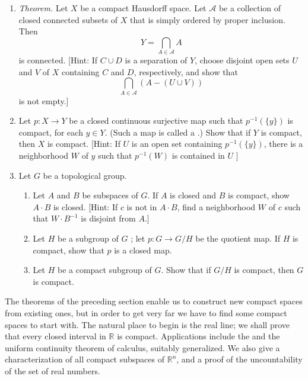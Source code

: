 \begin{enumerate}[itemsep=0.4em, parsep=0pt, topsep=0pt, partopsep=0pt, leftmargin=*, label=\arabic*., ref=\arabic*]
\begin{enumerate}[itemsep=0.2em, parsep=0pt, topsep=0pt, partopsep=0pt, leftmargin=*, label=(\alph*), align=left]
 \item Give examples to show that this theorem fails if you delete the requirement that \(X\) be compact, or if you delete the requirement that the sequence be monotone. [Hint: See the exercises of \S\ 21.]
 \end{enumerate}
\item \textsl{Theorem.} Let \(X\) be a compact Hausdorff space. Let \(\mathcal{A}\) be a collection of closed connected subsets of \(X\) that is simply ordered by proper inclusion. Then \[ Y = \mathop{\bigcap }\limits_{{A \in \mathcal{A}}}A \] is connected. [Hint: If \(C \cup D\) is a separation of \(Y\), choose disjoint open sets \(U\) and \(V\) of \(X\) containing \(C\) and \(D\), respectively, and show that \[ \mathop{\bigcap }\limits_{{A \in \mathcal{A}}}( {A - ( {U \cup V}) }) \] is not empty.]
\item Let \(p : X \rightarrow Y\) be a closed continuous surjective map such that \(p^{-1}( {\{ y\} })\) is compact, for each \(y \in Y\). (Such a map is called a .) Show that if \(Y\) is compact, then \(X\) is compact. [Hint: If \(U\) is an open set containing \(p^{-1}( {\{ y\} })\), there is a neighborhood \(W\) of \(y\) such that \(p^{-1}( W)\) is contained in \(U\) ]
\item Let \(G\) be a topological group.
 \begin{enumerate}[itemsep=0.2em, parsep=0pt, topsep=0pt, partopsep=0pt, leftmargin=*, label=(\alph*), align=left]
 \item Let \(A\) and \(B\) be subspaces of \(G\). If \(A\) is closed and \(B\) is compact, show \(A \cdot B\) is closed. [Hint: If \(c\) is not in \(A \cdot B\), find a neighborhood \(W\) of \(c\) such that \(W \cdot {B}^{-1}\) is disjoint from \(A\).]
 \item Let \(H\) be a subgroup of \(G\) ; let \(p : G \rightarrow G/H\) be the quotient map. If \(H\) is compact, show that \(p\) is a closed map.
 \item Let \(H\) be a compact subgroup of \(G\). Show that if \(G/H\) is compact, then \(G\) is compact.
 \end{enumerate}
\end{enumerate}

The theorems of the preceding section enable us to construct new compact spaces from existing ones, but in order to get very far we have to find some compact spaces to start with. The natural place to begin is the real line; we shall prove that every closed interval in \(\mathbb{R}\) is compact. Applications include the  and the uniform continuity theorem of calculus, suitably generalized. We also give a characterization of all compact subspaces of \(\mathbb{R}^{n}\), and a proof of the uncountability of the set of real numbers.

